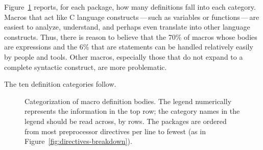 \documentclass[10pt]{article}
\newcommand{\captionsmall}[1]{\caption[]{\small #1}}
\begin{document}
Figure~\ref{fig:categorization} reports, for each package, how many
definitions fall into each category.  Macros that
act like C language constructs\,---\,such as variables or
functions\,---\,are easiest to analyze, understand, and perhaps even
translate into other language constructs.  Thus, there is reason to believe
that the 70\% of macros whose bodies are expressions and the 6\% that are
statements can be handled relatively easily by people and tools.  Other
macros, especially those that do not expand to a complete syntactic
construct, are more problematic.


The ten definition categories follow.  



\begin{figure}
\centerline{}
\captionsmall{Categorization of macro definition bodies.  The legend numerically
  represents the information in the top row; the category names in the
  legend should be read across, by rows.  The packages are ordered from
  most preprocessor directives per line to fewest (as in
  Figure~\ref{fig:directives-breakdown}).}
\label{fig:categorization}
\end{figure}



\label{sec:categorization-details}
\end{document}
